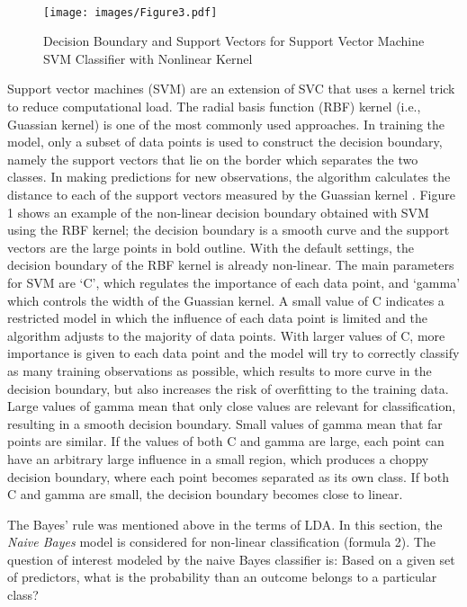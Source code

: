 \\\documentclass[sigconf]{acmart}
\begin{document}
\begin{figure}[!ht]
  \centering\texttt{[image: images/Figure3.pdf]}
  \caption{Decision Boundary and Support Vectors for Support Vector Machine 
  SVM Classifier with Nonlinear Kernel \cite{muller17}}
  \label{f:Figure3}
\end{figure}

Support vector machines (SVM) are an extension of SVC that uses a kernel 
trick to reduce computational load. The radial basis function (RBF) kernel 
(i.e., Guassian kernel) is one of the most commonly used approaches. 
In training the model, only a subset of data points is used to construct the 
decision boundary, namely the support vectors that lie on the border which 
separates the two classes. In making predictions for new observations, the 
algorithm calculates the distance to each of the support vectors measured by 
the Guassian kernel \cite{muller17}. Figure 1 shows an example of the non-linear 
decision boundary obtained with SVM using the RBF kernel; the decision boundary 
is a smooth curve and the support vectors are the large points in bold outline. 
With the default settings, the decision boundary of the RBF kernel is already 
non-linear. The main parameters for SVM are `C', which regulates the importance 
of each data point, and `gamma' which controls the width of the Guassian kernel. 
A small value of C indicates a restricted model in which the influence of each 
data point is limited and the algorithm adjusts to the majority of data points. 
With larger values of C, more importance is given to each data point and the 
model will try to correctly classify as many training observations as possible, 
which results to more curve in the decision boundary, but also increases the 
risk of overfitting to the training data. Large values of gamma mean that only 
close values are relevant for classification, resulting in a smooth decision 
boundary. Small values of gamma mean that far points are similar. If the values
of both C and gamma are large, each point can have an arbitrary large influence 
in a small region, which produces a choppy decision boundary, where each point 
becomes separated as its own class. If both C and gamma are small, the decision 
boundary becomes close to linear.


The Bayes' rule was mentioned above in the terms of LDA. In this section, 
the \emph{Naive Bayes} model is considered for non-linear classification
(formula 2). The question of interest modeled by the naive Bayes
classifier is: Based on a given set of predictors, what is the probability 
than an outcome belongs to a particular class?
\end{document}
